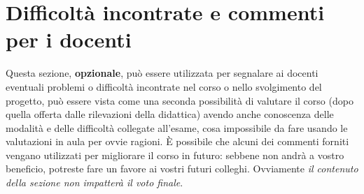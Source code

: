 \begin{comment}
\textbf{È richiesta una sezione per ciascun membro del gruppo, obbligatoriamente}.
%
Ciascuno dovrà autovalutare il proprio lavoro, elencando i punti di forza e di debolezza in quanto prodotto.
Si dovrà anche cercare di descrivere \emph{in modo quanto più obiettivo possibile} il proprio ruolo all'interno del gruppo.
Si ricorda, a tal proposito, che ciascuno studente è responsabile solo della propria sezione: non è un problema se ci sono opinioni contrastanti, a patto che rispecchino effettivamente l'opinione di chi le scrive.
Nel caso in cui si pensasse di portare avanti il progetto, ad esempio perché effettivamente impiegato, o perché sufficientemente ben riuscito da poter esser usato come dimostrazione di esser capaci progettisti, si descriva brevemente verso che direzione portarlo.
\end{comment}

\section{Difficoltà incontrate e commenti per i docenti}

Questa sezione, \textbf{opzionale}, può essere utilizzata per segnalare ai docenti eventuali problemi o difficoltà incontrate nel corso o nello svolgimento del progetto, può essere vista come una seconda possibilità di valutare il corso (dopo quella offerta dalle rilevazioni della didattica) avendo anche conoscenza delle modalità e delle difficoltà collegate all'esame, cosa impossibile da fare usando le valutazioni in aula per ovvie ragioni.
%
È possibile che alcuni dei commenti forniti vengano utilizzati per migliorare il corso in futuro: sebbene non andrà a vostro beneficio, potreste fare un favore ai vostri futuri colleghi.
%
Ovviamente \textit{il contenuto della sezione non impatterà il voto finale}.